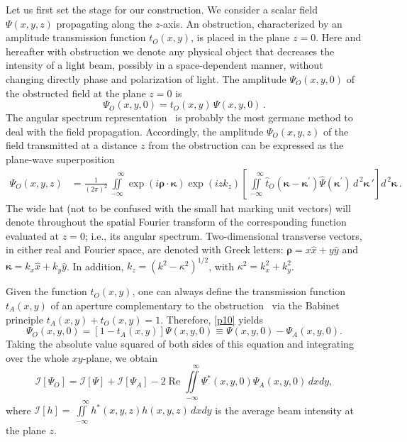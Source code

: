 \documentclass[10pt]{article}
\newcommand{\re}{\operatorname{Re}}
\newcommand{\vrho}{\bm{\rho}}
\newcommand{\vka}{\bm{\kappa}}
\newcommand{\dd}{{d^{\,2}}}
\begin{document}
Let us first set the stage for our construction. We consider a scalar
field $\Psi (x,y,z)$ propagating along the $z$-axis. An obstruction,
characterized by an amplitude transmission function $t_O (x,y)$,
is placed in the plane $z=0$. Here and hereafter with obstruction we
denote any physical object that decreases the intensity of a light
beam, possibly in a space-dependent manner, without changing directly
phase and polarization of light. The amplitude $\Psi_O(x,y,0)$ of the
obstructed field at the plane $z=0$ is
\begin{equation}
  \label{p10}
  \Psi_{O} (x,y,0) =  t_{O}(x,y) \, \Psi (x,y,0) \, .
\end{equation}
The angular spectrum representation~\cite{Mandel:1995aa} is probably
the most germane method to deal with the field propagation.  Accordingly, 
the amplitude $\Psi_{O}(x,y,z)$ of the field transmitted at a distance
$z$ from the obstruction can be expressed as the plane-wave superposition 
\begin{align}
  \label{p35}
  \Psi_{O}(x,y,z) &  =   
  \frac{1}{(2 \pi)^2}
  \iint\limits_{-\infty}^{\phantom{xx}\infty} 
 \exp (i \vrho \cdot \vka )  \exp (i z k_z )   
 \left[ \iint\limits_{-\infty}^{\phantom{xx}\infty} 
\widehat{t}_O(\vka - \vka{^{\prime}}) \widehat{\Psi}(\vka{^{\prime}}) \, 
 \dd  \vka{\,'} \right]  \dd \vka \, .
\end{align}
The wide hat (not to be confused with the small hat marking unit
vectors) will denote throughout the spatial Fourier transform of the
corresponding function evaluated at $z=0$; i.e., its angular
spectrum. Two-dimensional transverse vectors, in either real and
Fourier space, are denoted with Greek letters:
$\vrho = x \hat{x} + y \hat{y}$ and
$\vka = k_x \hat{x} + k_y \hat{y}$. In addition,
$k_z = (k^2 - \kappa^2 )^{1/2}$, with
$\kappa^2 = k_x^2 + k_y^2$.

Given the function $t_O(x,y)$, one can always define the transmission
function $t_A(x,y)$ of an aperture complementary to the
obstruction~\cite{Born:1999aa} via the Babinet principle
$t_A(x,y) + t_O(x,y) =1$. Therefore, \eqref{p10} yields 
\begin{equation}
  \label{p10b}
  \Psi_O(x,y,0)  =   [ 1 -t_A(x,y) ] \Psi (x,y,0) 
  \equiv   \Psi (x,y,0)  - \Psi_A(x,y,0).
\end{equation}
Taking the absolute value squared of both sides of this equation and
integrating over the whole $xy$-plane, we obtain
\begin{equation}
  \label{Lambda}
  \mathcal{I} [ \Psi_O ] = 
  \mathcal{I}[ \Psi ] + \mathcal{I}  [\Psi_A] 
  - 2 \re  \iint\limits_{-\infty}^{\phantom{xx}\infty} 
  \Psi^{\ast} (x,y,0) \Psi_A(x,y,0)  \, dx dy,
\end{equation}
where
$\mathcal{I} [h] = \iint\limits_{-\infty}^{\phantom{xx}\infty}
h^{\ast}(x,y,z) h(x,y,z) \, dx dy$ is the average beam intensity at
the plane $z$.
\end{document}
